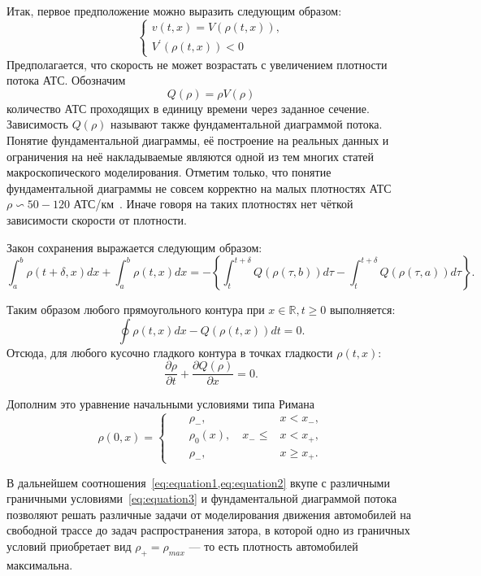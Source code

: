 Итак, первое предположение можно выразить следующим образом:
\begin{equation}
    \label{eq:equation1}
    \left\{
    \begin{array}{rl}
        v(t, x) = V(\rho(t, x)),\\
        V^{'}(\rho(t, x)) < 0
    \end{array}
    \right.
\end{equation}
Предполагается, что скорость не может возрастать с увеличением плотности потока АТС.
Обозначим
\[
    Q(\rho) = \rho V(\rho)
\]
количество АТС проходящих в единицу времени через заданное сечение.
Зависимость \( Q(\rho) \) называют также фундаментальной диаграммой потока.
Понятие фундаментальной диаграммы, её построение на реальных данных и ограничения на неё накладываемые являются одной из тем многих статей макроскопического моделирования.
Отметим только, что понятие фундаментальной диаграммы не совсем корректно на малых плотностях АТС \( \rho \backsim 50-120 \) АТС/км~\cite{kerner2009introduction}.
Иначе говоря на таких плотностях нет чёткой зависимости скорости от плотности.

Закон сохранения выражается следующим образом:
\[
    \int_{a}^{b} \rho(t + \delta, x)dx + \int_{a}^{b} \rho(t, x)dx = -\left\{\int_{t}^{t + \delta} Q(\rho(\tau, b))d\tau - \int_{t}^{t + \delta} Q(\rho(\tau, a))d\tau \right\}.
\]

Таким образом любого прямоугольного контура при $x\in \mathbb{R}, t\geq 0$ выполняется:
\[
    \oint \rho(t, x)dx - Q(\rho(t, x))dt = 0.
\]
Отсюда, для любого кусочно гладкого контура в точках гладкости \( \rho(t, x) \):
\begin{equation}
    \label{eq:equation2}
    \frac{\partial \rho}{\partial t} + \frac{\partial Q(\rho)}{\partial x} = 0.
\end{equation}

Дополним это уравнение начальными условиями типа Римана
\begin{equation}
    \label{eq:equation3}
    \rho(0, x) =
    \left\{
    \begin{alignedat}{3}
        &&\rho_{-},\quad &x<x_{-},  \\
        &&\rho_{0}(x),\quad x_{-}\leq &x<x_{+},  \\
        &&\rho_{-},\quad &x\geq x_{+}.
    \end{alignedat}
    \right.
\end{equation}

В дальнейшем соотношения~\cref{eq:equation1,eq:equation2} вкупе с различными граничными условиями~\cref{eq:equation3} и фундаментальной диаграммой потока позволяют решать различные задачи от моделирования движения автомобилей на свободной трассе до задач распространения затора, в которой одно из граничных условий приобретает вид \(\rho_{+} = \rho_{max}\) --- то есть плотность автомобилей максимальна.

